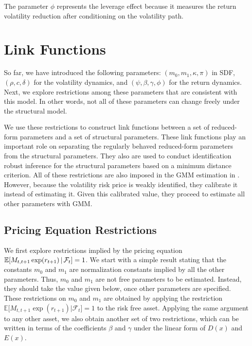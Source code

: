 The parameter $\phi$ represents the leverage effect because it measures the return volatility reduction after conditioning on the volatility path. 

\section{Link Functions}\label{sec:ilnk functions}

So far, we have introduced the following parameters: $(m_{0},m_{1},\kappa ,\pi )$ in SDF, $(\rho ,c,\delta)$ for the volatility dynamics, and $(\psi ,\beta ,\gamma ,\phi )$ for the return dynamics. Next, we explore restrictions among these parameters that are consistent with this model. In other words, not all of these parameters can change freely under the structural model.

We use these restrictions to construct link functions between a set of reduced-form parameters and a set of structural parameters. These link functions play an important role on separating the regularly behaved reduced-form parameters from the structural parameters. They also are used to conduct identification robust inference for the structural parameters based on a minimum distance criterion.
All of these restrictions are also imposed in the GMM estimation in \textcite{han2018leverage}. However, because the volatility risk price is weakly identified, they calibrate it instead of estimating it. Given this calibrated value, they proceed to estimate all other parameters with GMM. 

\subsection{Pricing Equation Restrictions}

We first explore restrictions implied by the pricing equation $\operatorname{\mathbb{E}}[ M_{t,t+1}\exp (r_{t+1}) \,\vert\, \mathcal{F}_{t}]=1$. We start with a simple result stating that the constants $m_{0}$ and $m_{1}$ are normalization constants implied by all the other parameters. Thus, $m_{0}$ and $m_{1}$ are not free parameters to be estimated. Instead, they should take the value given below, once other parameters are specified. These restrictions on $m_{0}$ and $m_{1}$ are obtained by applying the restriction $\mathbb{E[} M_{t,t+1}\exp (r_{t+1})|\mathcal{F}_{t}]=1$ to the risk free asset. Applying the same argument to any other asset, we also obtain another set of two restrictions, which can be written in terms of the coefficients $\beta $ and $ \gamma $ under the linear form of $D(x)$ and $E(x)$.

